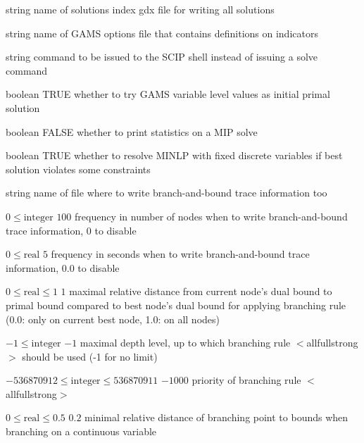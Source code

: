 %
{string}%
{}%
{name of solutions index gdx file for writing all solutions}%
{}

%
{string}%
{}%
{name of GAMS options file that contains definitions on indicators}%
{}

%
{string}%
{}%
{command to be issued to the SCIP shell instead of issuing a solve command}%
{}

%
{boolean}%
{TRUE}%
{whether to try GAMS variable level values as initial primal solution}%
{}

%
{boolean}%
{FALSE}%
{whether to print statistics on a MIP solve}%
{}

%
{boolean}%
{TRUE}%
{whether to resolve MINLP with fixed discrete variables if best solution violates some constraints}%
{}

%
{string}%
{}%
{name of file where to write branch-and-bound trace information too}%
{}

%
{$0\leq\textrm{integer}$}%
{$100$}%
{frequency in number of nodes when to write branch-and-bound trace information, 0 to disable}%
{}

%
{$0\leq\textrm{real}$}%
{$5$}%
{frequency in seconds when to write branch-and-bound trace information, 0.0 to disable}%
{}

%
{$0\leq\textrm{real}\leq1$}%
{$1$}%
{maximal relative distance from current node's dual bound to primal bound compared to best node's dual bound for applying branching rule (0.0: only on current best node, 1.0: on all nodes)}%
{}

%
{$-1\leq\textrm{integer}$}%
{$-1$}%
{maximal depth level, up to which branching rule $<$allfullstrong$>$ should be used (-1 for no limit)}%
{}

%
{$-536870912\leq\textrm{integer}\leq536870911$}%
{$-1000$}%
{priority of branching rule $<$allfullstrong$>$}%
{}

%
{$0\leq\textrm{real}\leq0.5$}%
{$0.2$}%
{minimal relative distance of branching point to bounds when branching on a continuous variable}%
{}

